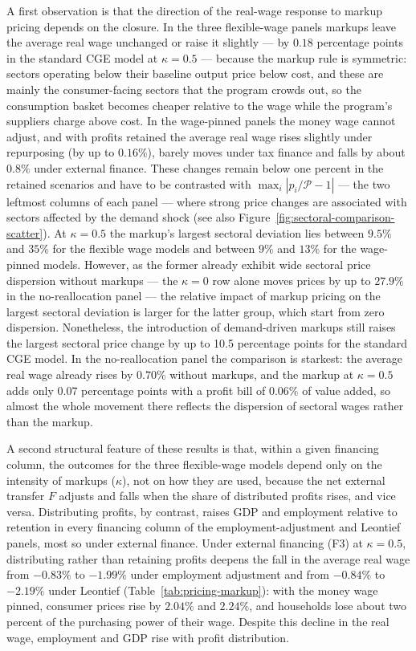 

A first observation is that the direction of the real-wage response to markup pricing depends on the closure. In the three flexible-wage panels markups leave the average real wage unchanged or raise it slightly --- by $0.18$ percentage points in the standard CGE model at $\kappa = 0.5$ --- because the markup rule is symmetric: sectors operating below their baseline output price below cost, and these are mainly the consumer-facing sectors that the program crowds out, so the consumption basket becomes cheaper relative to the wage while the program's suppliers charge above cost. In the wage-pinned panels the money wage cannot adjust, and with profits retained the average real wage rises slightly under repurposing (by up to $0.16\%$), barely moves under tax finance and falls by about $0.8\%$ under external finance. These changes remain below one percent in the retained scenarios and have to be contrasted with $\max_i |p_i/\mathcal{P} - 1|$ --- the two leftmost columns of each panel --- where strong price changes are associated with sectors affected by the demand shock (see also Figure~\ref{fig:sectoral-comparison-scatter}). At $\kappa = 0.5$ the markup's largest sectoral deviation lies between $9.5\%$ and $35\%$ for the flexible wage models and between $9\%$ and $13\%$ for the wage-pinned models. However, as the former already exhibit wide sectoral price dispersion without markups --- the $\kappa = 0$ row alone moves prices by up to $27.9\%$ in the no-reallocation panel --- the relative impact of markup pricing on the largest sectoral deviation is larger for the latter group, which start from zero dispersion. Nonetheless, the introduction of demand-driven markups still raises the largest sectoral price change by up to 10.5 percentage points for the standard CGE model. In the no-reallocation panel the comparison is starkest: the average real wage already rises by $0.70\%$ without markups, and the markup at $\kappa = 0.5$ adds only $0.07$ percentage points with a profit bill of $0.06\%$ of value added, so almost the whole movement there reflects the dispersion of sectoral wages rather than the markup.

A second structural feature of these results is that, within a given financing column, the outcomes for the three flexible-wage models depend only on the intensity of markups ($\kappa$), not on how they are used, because the net external transfer $F$ adjusts and falls when the share of distributed profits rises, and vice versa. Distributing profits, by contrast, raises GDP and employment relative to retention in every financing column of the employment-adjustment and Leontief panels, most so under external finance. Under external financing (F3) at $\kappa = 0.5$, distributing rather than retaining profits deepens the fall in the average real wage from $-0.83\%$ to $-1.99\%$ under employment adjustment and from $-0.84\%$ to $-2.19\%$ under Leontief (Table~\ref{tab:pricing-markup}): with the money wage pinned, consumer prices rise by $2.04\%$ and $2.24\%$, and households lose about two percent of the purchasing power of their wage. Despite this decline in the real wage, employment and GDP rise with profit distribution.

